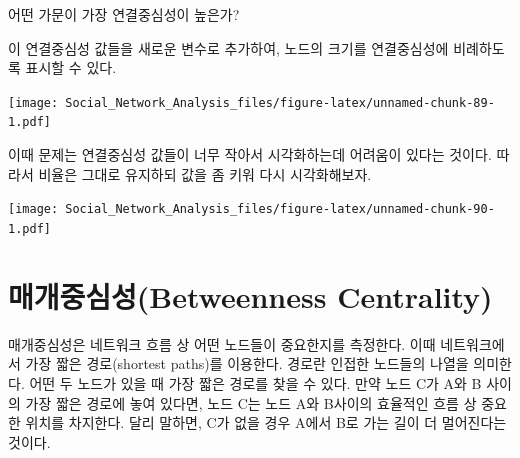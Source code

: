 \documentclass[
]{book}
\newenvironment{Shaded}{\begin{snugshade}}{\end{snugshade}}
\newcommand{\AttributeTok}[1]{\textcolor[rgb]{0.77,0.63,0.00}{#1}}
\newcommand{\CommentTok}[1]{\textcolor[rgb]{0.56,0.35,0.01}{\textit{#1}}}
\newcommand{\DecValTok}[1]{\textcolor[rgb]{0.00,0.00,0.81}{#1}}
\newcommand{\FunctionTok}[1]{\textcolor[rgb]{0.00,0.00,0.00}{#1}}
\newcommand{\NormalTok}[1]{#1}
\newcommand{\OtherTok}[1]{\textcolor[rgb]{0.56,0.35,0.01}{#1}}
\newcommand{\SpecialCharTok}[1]{\textcolor[rgb]{0.00,0.00,0.00}{#1}}
\newcommand{\StringTok}[1]{\textcolor[rgb]{0.31,0.60,0.02}{#1}}
\begin{document}
어떤 가문이 가장 연결중심성이 높은가?

이 연결중심성 값들을 새로운 변수로 추가하여, 노드의 크기를 연결중심성에 비례하도록 표시할 수 있다.

\begin{Shaded}
\end{Shaded}

\texttt{[image: Social\_Network\_Analysis\_files/figure-latex/unnamed-chunk-89-1.pdf]}

이때 문제는 연결중심성 값들이 너무 작아서 시각화하는데 어려움이 있다는 것이다. 따라서 비율은 그대로 유지하되 값을 좀 키워 다시 시각화해보자.

\begin{Shaded}
\end{Shaded}

\texttt{[image: Social\_Network\_Analysis\_files/figure-latex/unnamed-chunk-90-1.pdf]}

\hypertarget{uxb9e4uxac1cuxc911uxc2ecuxc131betweenness-centrality}{%
\section{매개중심성(Betweenness Centrality)}\label{uxb9e4uxac1cuxc911uxc2ecuxc131betweenness-centrality}}

매개중심성은 네트워크 흐름 상 어떤 노드들이 중요한지를 측정한다. 이때 네트워크에서 가장 짧은 경로(shortest paths)를 이용한다. 경로란 인접한 노드들의 나열을 의미한다. 어떤 두 노드가 있을 때 가장 짧은 경로를 찾을 수 있다. 만약 노드 C가 A와 B 사이의 가장 짧은 경로에 놓여 있다면, 노드 C는 노드 A와 B사이의 효율적인 흐름 상 중요한 위치를 차지한다. 달리 말하면, C가 없을 경우 A에서 B로 가는 길이 더 멀어진다는 것이다.
\end{document}
